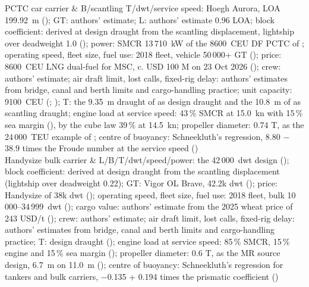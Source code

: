 PCTC car carrier & B/scantling T/dwt/service speed: Hoegh Aurora, LOA 199.92~m (\citealp{baird2024_hoegh_aurora}); GT: authors' estimate; L: authors' estimate 0.96 LOA; block coefficient: derived at design draught from the scantling displacement, lightship over deadweight 1.0 (\citealp[Table 1.01]{man2011}); power: SMCR 13\,710~kW of the \num{8600}~CEU DF PCTC of \citet{keh_8600ceu_df_pctc}; operating speed, fleet size, fuel use: 2018 fleet, vehicle 50\,000+ GT (\citealp[Table 35]{faber2020}); price: \num{8600}~CEU LNG dual-fuel for MSC, c. USD 100 M on 23 Oct 2026 (\citealp[p. 7]{allied2026}); crew: authors' estimate; air draft limit, lost calls, fixed-rig delay: authors' estimates from bridge, canal and berth limits and cargo-handling practice; unit capacity: \num{9100}~CEU (\citealp{deltamarin_hoegh_aurora}; \citealp{hoegh_aurora_class}); T: the 9.35~m draught of \citet{deltamarin_hoegh_aurora} as design draught and the 10.8~m of \citet{baird2024_hoegh_aurora} as scantling draught; engine load at service speed: 43\,\% SMCR at 15.0~kn with 15\,\% sea margin (\citealp{keh_8600ceu_df_pctc}), by the cube law 39\,\% at 14.5~kn; propeller diameter: 0.74 T, as the 24\,000~TEU example of \citet{man2011}; centre of buoyancy: Schneekluth's regression, 8.80 \ensuremath{-} 38.9 times the Froude number at the service speed (\citealp[slide 16]{ventura_estimation}) \\
Handysize bulk carrier & L/B/T/dwt/speed/power: the 42\,000~dwt design (\citealp[Table 4]{man2022bulk}); block coefficient: derived at design draught from the scantling displacement (lightship over deadweight 0.22); GT: Vigor OL Brave, 42.2k dwt (\citealp{baird2026vigor}); price: Handysize of 38k dwt (\citealp[pp. 7 and 16]{allied2026}); operating speed, fleet size, fuel use: 2018 fleet, bulk 10\,000--34\,999~dwt (\citealp[Table 35]{faber2020}); cargo value: authors' estimate from the 2025 wheat price of 243 USD/t (\citealp{worldbank2026}); crew: authors' estimate; air draft limit, lost calls, fixed-rig delay: authors' estimates from bridge, canal and berth limits and cargo-handling practice; T: design draught (\citealp[Table 4]{man2022bulk}); engine load at service speed: 85\,\% SMCR, 15\,\% engine and 15\,\% sea margin (\citealp[Table 4]{man2022bulk}); propeller diameter: 0.6 T, as the MR source design, 6.7~m on 11.0~m (\citealp[Tables 1-2]{man2019mr}); centre of buoyancy: Schneekluth's regression for tankers and bulk carriers, \ensuremath{-}0.135 + 0.194 times the prismatic coefficient (\citealp[slide 16]{ventura_estimation}) \\
